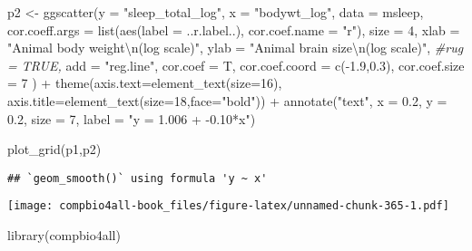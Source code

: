 \documentclass[
]{book}
\newenvironment{Shaded}{\begin{snugshade}}{\end{snugshade}}
\newcommand{\AttributeTok}[1]{\textcolor[rgb]{0.77,0.63,0.00}{#1}}
\newcommand{\CommentTok}[1]{\textcolor[rgb]{0.56,0.35,0.01}{\textit{#1}}}
\newcommand{\DecValTok}[1]{\textcolor[rgb]{0.00,0.00,0.81}{#1}}
\newcommand{\FloatTok}[1]{\textcolor[rgb]{0.00,0.00,0.81}{#1}}
\newcommand{\FunctionTok}[1]{\textcolor[rgb]{0.00,0.00,0.00}{#1}}
\newcommand{\NormalTok}[1]{#1}
\newcommand{\OtherTok}[1]{\textcolor[rgb]{0.56,0.35,0.01}{#1}}
\newcommand{\SpecialCharTok}[1]{\textcolor[rgb]{0.00,0.00,0.00}{#1}}
\newcommand{\StringTok}[1]{\textcolor[rgb]{0.31,0.60,0.02}{#1}}
\begin{document}
\begin{Shaded}
\begin{Highlighting}[]
\NormalTok{p2 }\OtherTok{\textless{}{-}} \FunctionTok{ggscatter}\NormalTok{(}\AttributeTok{y =} \StringTok{"sleep\_total\_log"}\NormalTok{, }
          \AttributeTok{x =} \StringTok{"bodywt\_log"}\NormalTok{, }
          \AttributeTok{data =}\NormalTok{ msleep,}
           \AttributeTok{cor.coeff.args =} \FunctionTok{list}\NormalTok{(}\FunctionTok{aes}\NormalTok{(}\AttributeTok{label =}\NormalTok{ ..r.label..),}
                                  \AttributeTok{cor.coef.name =} \StringTok{"r"}\NormalTok{),}
          \AttributeTok{size =} \DecValTok{4}\NormalTok{,}
          \AttributeTok{xlab =} \StringTok{"Animal body weight}\SpecialCharTok{\textbackslash{}n}\StringTok{(log scale)"}\NormalTok{,}
          \AttributeTok{ylab =} \StringTok{"Animal brain size}\SpecialCharTok{\textbackslash{}n}\StringTok{(log scale)"}\NormalTok{,}
          \CommentTok{\#rug = TRUE,}
          \AttributeTok{add =} \StringTok{"reg.line"}\NormalTok{,}
          \AttributeTok{cor.coef =}\NormalTok{ T,}
          \AttributeTok{cor.coef.coord =} \FunctionTok{c}\NormalTok{(}\SpecialCharTok{{-}}\FloatTok{1.9}\NormalTok{,}\FloatTok{0.3}\NormalTok{),}
          \AttributeTok{cor.coef.size =} \DecValTok{7}
\NormalTok{          ) }\SpecialCharTok{+}
      \FunctionTok{theme}\NormalTok{(}\AttributeTok{axis.text=}\FunctionTok{element\_text}\NormalTok{(}\AttributeTok{size=}\DecValTok{16}\NormalTok{),}
        \AttributeTok{axis.title=}\FunctionTok{element\_text}\NormalTok{(}\AttributeTok{size=}\DecValTok{18}\NormalTok{,}\AttributeTok{face=}\StringTok{"bold"}\NormalTok{)) }\SpecialCharTok{+}
  \FunctionTok{annotate}\NormalTok{(}\StringTok{"text"}\NormalTok{,}
           \AttributeTok{x =} \FloatTok{0.2}\NormalTok{,}
           \AttributeTok{y =} \FloatTok{0.2}\NormalTok{,}
           \AttributeTok{size =} \DecValTok{7}\NormalTok{,}
           \AttributeTok{label =} \StringTok{"y = 1.006 + {-}0.10*x"}\NormalTok{)}

    
                

\FunctionTok{plot\_grid}\NormalTok{(p1,p2)}
\end{Highlighting}
\end{Shaded}

\begin{verbatim}
## `geom_smooth()` using formula 'y ~ x'
\end{verbatim}

\texttt{[image: compbio4all-book\_files/figure-latex/unnamed-chunk-365-1.pdf]}

\begin{Shaded}
\begin{Highlighting}[]
\FunctionTok{library}\NormalTok{(compbio4all)}
\end{Highlighting}
\end{Shaded}
\end{document}
